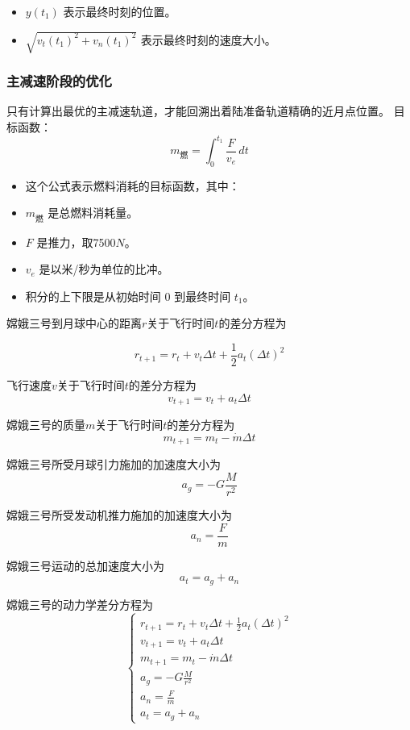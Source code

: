 \documentclass{ctexart}
\begin{document}
\begin{itemize}
\item $y(t_1)$ 表示最终时刻的位置。
\item $\sqrt{v_t(t_1)^2 + v_n(t_1)^2}$ 表示最终时刻的速度大小。
\end{itemize}

	\subsubsection{主减速阶段的优化}
只有计算出最优的主减速轨道，才能回溯出着陆准备轨道精确的近月点位置。
目标函数：
\begin{equation}
m_{\text{燃}} = \int_0^{t_1} \frac{F}{v_e} \, dt
\end{equation}

\begin{itemize}
\item 这个公式表示燃料消耗的目标函数，其中：
\item $m_{\text{燃}}$ 是总燃料消耗量。
\item $F$ 是推力，取7500\(N\)。
\item $v_e$ 是以米/秒为单位的比冲。
\item 积分的上下限是从初始时间 $0$ 到最终时间 $t_1$。
\end{itemize}

嫦娥三号到月球中心的距离\(r\)关于飞行时间\(t\)的差分方程为

\[r_{t+1} = r_t + v_t \Delta t + \frac{1}{2} a_t (\Delta t)^2\]

飞行速度\(v\)关于飞行时间\(t\)的差分方程为
\[v_{t+1} = v_t + a_t \Delta t\]

嫦娥三号的质量\(m\)关于飞行时间\(t\)的差分方程为
\[m_{t+1} = m_t - \dot{m} \Delta t\]

嫦娥三号所受月球引力施加的加速度大小为
\[a_g = - G \frac{M}{r^2}\]

嫦娥三号所受发动机推力施加的加速度大小为
\[a_n = \frac{F}{m}\]

嫦娥三号运动的总加速度大小为
\[a_t = a_g + a_n\]

嫦娥三号的动力学差分方程为
\[
\begin{cases}
r_{t+1} = r_t + v_t \Delta t + \frac{1}{2} a_t (\Delta t)^2 \\
v_{t+1} = v_t + a_t \Delta t \\
m_{t+1} = m_t - \dot{m} \Delta t \\
a_g = - G \frac{M}{r^2} \\
a_n = \frac{F}{m} \\
a_t = a_g + a_n
\end{cases}
\]
\end{document}

